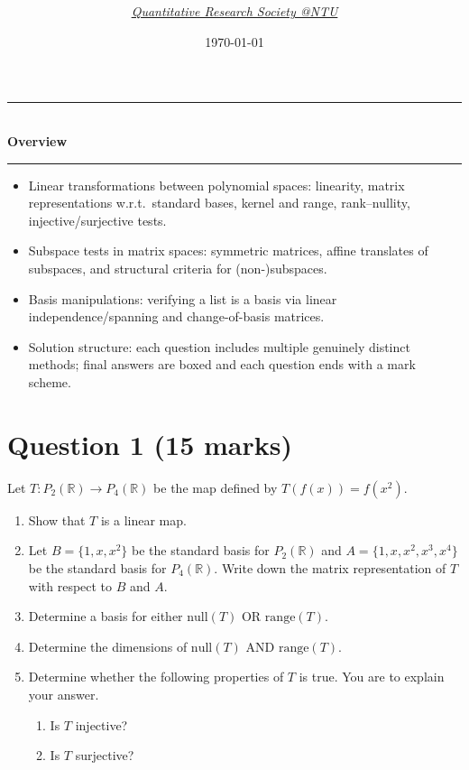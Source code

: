 \documentclass[12pt]{article}
\title{
\Huge \CourseCode\ \CourseName \\[0.3em]
\Large \DocType  \\[0.3em]
\ExamMeta
}
\author{
  \textit{\href{https://qrsntu.org}{Quantitative Research Society @NTU}}
}
\date{\today}
\newenvironment{overview}{
  \par\bigskip
  \begin{center}
    \rule{0.92\linewidth}{0.6pt}\\[-0.2em]
    \textbf{Overview}\\[-0.2em]
    \rule{0.92\linewidth}{0.6pt}
  \end{center}
  \vspace{-0.3em}
  \begin{itemize}[leftmargin=1.6em, itemsep=0.2em, topsep=0.2em]
}{
  \end{itemize}
  \par\bigskip
}
\begin{document}
\maketitle
\thispagestyle{plainfirst}
\pagestyle{main}

\begin{overview}
  \item Linear transformations between polynomial spaces: linearity, matrix representations w.r.t.\ standard bases, kernel and range, rank--nullity, injective/surjective tests.
  \item Subspace tests in matrix spaces: symmetric matrices, affine translates of subspaces, and structural criteria for (non-)subspaces.
  \item Basis manipulations: verifying a list is a basis via linear independence/spanning and change-of-basis matrices.
  \item Solution structure: each question includes multiple genuinely distinct methods; final answers are boxed and each question ends with a mark scheme.
\end{overview}

\newpage
\tableofcontents
\newpage
\section{Question 1 \hfill (15 marks)}

Let $T : P_2(\mathbb{R}) \to P_4(\mathbb{R})$ be the map defined by $T(f(x)) = f(x^2)$.
\begin{enumerate}[label=(\alph*)]
\item Show that $T$ is a linear map.
\item Let $B = \{1, x, x^2\}$ be the standard basis for $P_2(\mathbb{R})$ and $A = \{1, x, x^2, x^3, x^4\}$ be the standard basis for $P_4(\mathbb{R})$. Write down the matrix representation of $T$ with respect to $B$ and $A$.
\item Determine a basis for either $\mathrm{null}(T)$ OR $\mathrm{range}(T)$.
\item Determine the dimensions of $\mathrm{null}(T)$ AND $\mathrm{range}(T)$.
\item Determine whether the following properties of $T$ is true. You are to explain your answer.
  \begin{enumerate}[label=(\roman*)]
  \item Is $T$ injective?
  \item Is $T$ surjective?
  \end{enumerate}
\end{enumerate}
\end{document}
